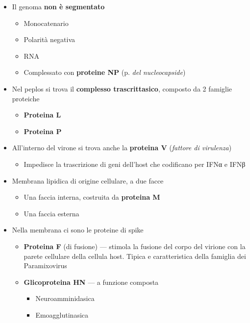 \documentclass[italian,]{article}
\providecommand{\tightlist}{%
  \setlength{\itemsep}{0pt}\setlength{\parskip}{0pt}}
\begin{document}
\begin{itemize}
\tightlist
\item
  Il genoma \textbf{non è segmentato}

  \begin{itemize}
  \tightlist
  \item
    Monocatenario
  \item
    Polarità negativa
  \item
    RNA
  \item
    Complessato con \textbf{proteine NP} (p. \emph{del nucleocapside})
  \end{itemize}
\item
  Nel peplos si trova il \textbf{complesso trascrittasico}, composto da
  2 famiglie proteiche

  \begin{itemize}
  \tightlist
  \item
    \textbf{Proteina L}
  \item
    \textbf{Proteina P}
  \end{itemize}
\item
  All'interno del virone si trova anche la \textbf{proteina V}
  (\emph{fattore di virulenza})

  \begin{itemize}
  \tightlist
  \item
    Impedisce la trascrizione di geni dell'host che codificano per IFNα
    e IFNβ
  \end{itemize}
\item
  Membrana lipidica di origine cellulare, a due facce

  \begin{itemize}
  \tightlist
  \item
    Una faccia interna, costruita da \textbf{proteina M}
  \item
    Una faccia esterna
  \end{itemize}
\item
  Nella membrana ci sono le proteine di spike

  \begin{itemize}
  \tightlist
  \item
    \textbf{Proteina F} (di fusione) --- stimola la fusione del corpo
    del virione con la parete cellulare della cellula host. Tipica e
    caratteristica della famiglia dei Paramixovirus
  \item
    \textbf{Glicoproteina HN} --- a funzione composta

    \begin{itemize}
    \tightlist
    \item
      Neuroamminidasica
    \item
      Emoagglutinasica
    \end{itemize}
  \end{itemize}
\end{itemize}
\end{document}
